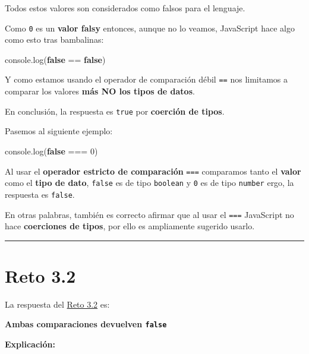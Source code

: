 \documentclass[
  letterpaper,
  DIV=11,
  numbers=noendperiod]{scrreprt}
\newenvironment{Shaded}{\begin{snugshade}}{\end{snugshade}}
\newcommand{\BuiltInTok}[1]{\textcolor[rgb]{0.00,0.23,0.31}{#1}}
\newcommand{\DecValTok}[1]{\textcolor[rgb]{0.68,0.00,0.00}{#1}}
\newcommand{\FunctionTok}[1]{\textcolor[rgb]{0.28,0.35,0.67}{#1}}
\newcommand{\KeywordTok}[1]{\textcolor[rgb]{0.00,0.23,0.31}{\textbf{#1}}}
\newcommand{\NormalTok}[1]{\textcolor[rgb]{0.00,0.23,0.31}{#1}}
\newcommand{\OperatorTok}[1]{\textcolor[rgb]{0.37,0.37,0.37}{#1}}
\begin{document}
Todos estos valores son considerados como falsos para el lenguaje.

Como \texttt{0} es un \textbf{valor falsy} entonces, aunque no lo
veamos, JavaScript hace algo como esto tras bambalinas:

\begin{Shaded}
\begin{Highlighting}[]
\BuiltInTok{console}\OperatorTok{.}\FunctionTok{log}\NormalTok{(}\KeywordTok{false} \OperatorTok{==} \KeywordTok{false}\NormalTok{)}
\end{Highlighting}
\end{Shaded}

Y como estamos usando el operador de comparación débil \texttt{==} nos
limitamos a comparar los valores \textbf{más NO los tipos de datos}.

En conclusión, la respuesta es \texttt{true} por \textbf{coerción de
tipos}.

Pasemos al siguiente ejemplo:

\begin{Shaded}
\begin{Highlighting}[]
\BuiltInTok{console}\OperatorTok{.}\FunctionTok{log}\NormalTok{(}\KeywordTok{false} \OperatorTok{===} \DecValTok{0}\NormalTok{)}
\end{Highlighting}
\end{Shaded}

Al usar el \textbf{operador estricto de comparación} \texttt{===}
comparamos tanto el \textbf{valor} como el \textbf{tipo de dato},
\texttt{false} es de tipo \texttt{boolean} y \texttt{0} es de tipo
\texttt{number} ergo, la respuesta es \texttt{false}.

En otras palabras, también es correcto afirmar que al usar el
\texttt{===} JavaScript no hace \textbf{coerciones de tipos}, por ello
es ampliamente sugerido usarlo.

\begin{center}\rule{0.5\linewidth}{0.5pt}\end{center}

\section{Reto 3.2}\label{sec-sol-cap3-reto2}

La respuesta del \hyperref[sec-cap3-reto2]{Reto 3.2} es:

\textbf{Ambas comparaciones devuelven \texttt{false}}

\textbf{Explicación:}
\end{document}
